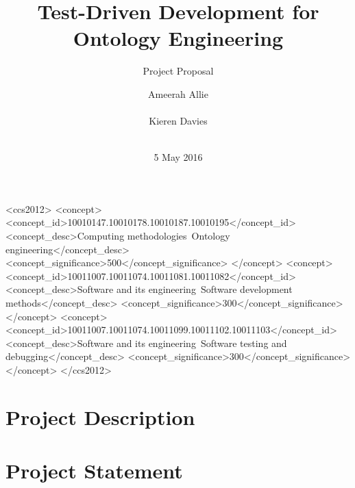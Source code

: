 \documentclass[draft]{sig-alternate}
\newcommand{\todo}[1][]{\ifdraft{\ifthenelse{\isempty{#1}}{\hl{(TODO)}}{\hl{(TODO: #1)}}}{}}
\begin{document}
\title{Test-Driven Development for Ontology Engineering}
\subtitle{Project Proposal}
\author{
  \alignauthor
  Ameerah Allie\\
    \\
  \alignauthor
  Kieren Davies\\
   \\
}
\date{5 May 2016}
\maketitle

\begin{abstract}
  \todo
\end{abstract}

\begin{CCSXML}
<ccs2012>
  <concept>
    <concept_id>10010147.10010178.10010187.10010195</concept_id>
    <concept_desc>Computing methodologies~Ontology engineering</concept_desc>
    <concept_significance>500</concept_significance>
  </concept>
  <concept>
    <concept_id>10011007.10011074.10011081.10011082</concept_id>
    <concept_desc>Software and its engineering~Software development methods</concept_desc>
    <concept_significance>300</concept_significance>
  </concept>
  <concept>
    <concept_id>10011007.10011074.10011099.10011102.10011103</concept_id>
    <concept_desc>Software and its engineering~Software testing and debugging</concept_desc>
    <concept_significance>300</concept_significance>
  </concept>
</ccs2012>
\end{CCSXML}

\printccsdesc


\section{Project Description}

\todo

\section{Project Statement}
\end{document}
